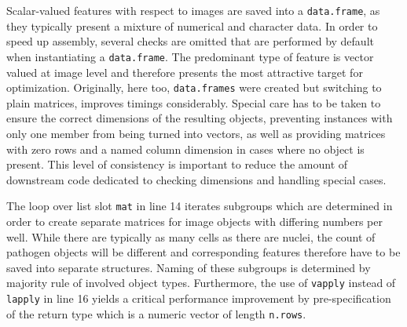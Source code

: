 
Scalar-valued features with respect to images are saved into a \texttt{data.frame}, as they typically present a mixture of numerical and character data. In order to speed up assembly, several checks are omitted that are performed by default when instantiating a \texttt{data.frame}. The predominant type of feature is vector valued at image level and therefore presents the most attractive target for optimization. Originally, here too, \texttt{data.frames} were created but switching to plain matrices, improves timings considerably. Special care has to be taken to ensure the correct dimensions of the resulting objects, preventing instances with only one member from being turned into vectors, as well as providing matrices with zero rows and a named column dimension in cases where no object is present. This level of consistency is important to reduce the amount of downstream code dedicated to checking dimensions and handling special cases.

The loop over list slot \texttt{mat} in line 14 iterates subgroups which are determined in order to create separate matrices for image objects with differing numbers per well. While there are typically as many cells as there are nuclei, the count of pathogen objects will be different and corresponding features therefore have to be saved into separate structures. Naming of these subgroups is determined by majority rule of involved object types. Furthermore, the use of \texttt{vapply} instead of \texttt{lapply} in line 16 yields a critical performance improvement by pre-specification of the return type which is a numeric vector of length \texttt{n.rows}.


